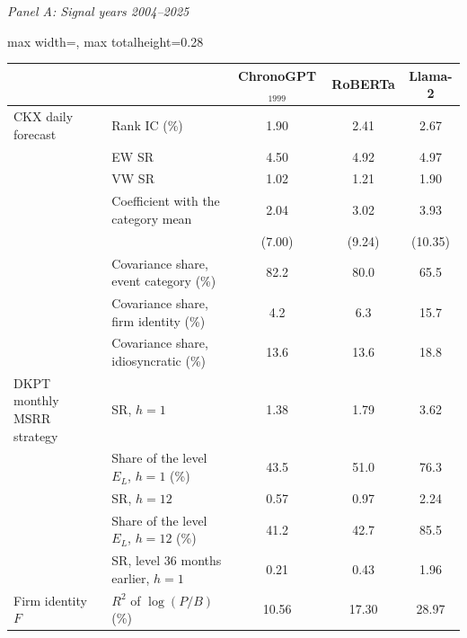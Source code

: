 \begin{table}[htbp]
{\footnotesize
\textit{Panel A: Signal years 2004--2025}\\[2pt]
\begin{adjustbox}{max width=\linewidth, max totalheight=0.28\textheight}
\begin{tabular}{llccc}
\toprule
 &  & ChronoGPT$_{1999}$ & RoBERTa & Llama-2 \\
\midrule
CKX daily forecast & Rank IC (\%) & \phantom{$-$(0}1.90\phantom{)} & \phantom{$-$(0}2.41\phantom{)} & \phantom{(0}2.67\phantom{)} \\
 & EW SR & \phantom{$-$(0}4.50\phantom{)} & \phantom{$-$(0}4.92\phantom{)} & \phantom{(0}4.97\phantom{)} \\
 & VW SR & \phantom{$-$(0}1.02\phantom{)} & \phantom{$-$(0}1.21\phantom{)} & \phantom{(0}1.90\phantom{)} \\
 & Coefficient with the category mean & \phantom{$-$(0}2.04\phantom{)} & \phantom{$-$(0}3.02\phantom{)} & \phantom{(0}3.93\phantom{)} \\
 &  & \phantom{$-$0}(7.00) & \phantom{$-$0}(9.24) & (10.35) \\
 & Covariance share, event category (\%) & \phantom{$-$(}82.2\phantom{)0} & \phantom{$-$(}80.0\phantom{)0} & \phantom{(}65.5\phantom{)0} \\
 & Covariance share, firm identity (\%) & \phantom{$-$(0}4.2\phantom{)0} & \phantom{$-$(0}6.3\phantom{)0} & \phantom{(}15.7\phantom{)0} \\
 & Covariance share, idiosyncratic (\%) & \phantom{$-$(}13.6\phantom{)0} & \phantom{$-$(}13.6\phantom{)0} & \phantom{(}18.8\phantom{)0} \\
\midrule
DKPT monthly MSRR strategy & SR, $h=1$ & \phantom{$-$(0}1.38\phantom{)} & \phantom{$-$(0}1.79\phantom{)} & \phantom{(0}3.62\phantom{)} \\
 & Share of the level $E_L$, $h=1$ (\%) & \phantom{$-$(}43.5\phantom{)0} & \phantom{$-$(}51.0\phantom{)0} & \phantom{(}76.3\phantom{)0} \\
 & SR, $h=12$ & \phantom{$-$(0}0.57\phantom{)} & \phantom{$-$(0}0.97\phantom{)} & \phantom{(0}2.24\phantom{)} \\
 & Share of the level $E_L$, $h=12$ (\%) & \phantom{$-$(}41.2\phantom{)0} & \phantom{$-$(}42.7\phantom{)0} & \phantom{(}85.5\phantom{)0} \\
 & SR, level 36 months earlier, $h=1$ & \phantom{$-$(0}0.21\phantom{)} & \phantom{$-$(0}0.43\phantom{)} & \phantom{(0}1.96\phantom{)} \\
\midrule
Firm identity $F$ & $R^2$ of $\log(P/B)$ (\%) & \phantom{$-$(}10.56\phantom{)} & \phantom{$-$(}17.30\phantom{)} & \phantom{(}28.97\phantom{)} \\

\end{tabular}
\end{adjustbox}}
\end{table}
